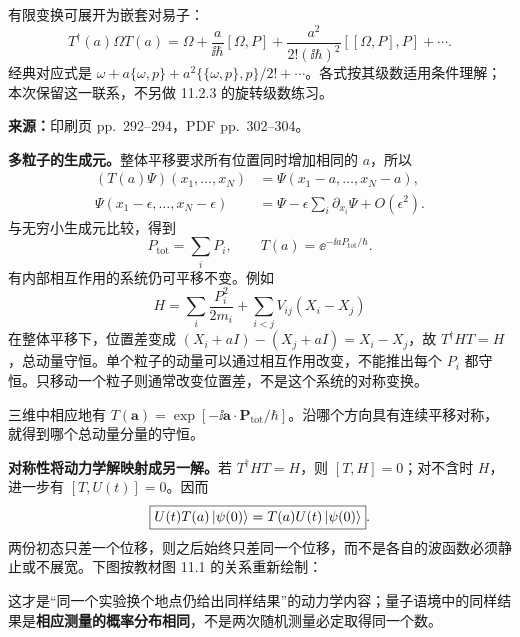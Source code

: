 有限变换可展开为嵌套对易子：
\begin{equation}
  T^\dagger(a)\Omega T(a)
   =\Omega+\frac{a}{\ii\hbar}[\Omega,P]
     +\frac{a^2}{2!(\ii\hbar)^2}[[\Omega,P],P]+\cdots.
\end{equation}
经典对应式是 $\omega+a\{\omega,p\}+a^2\{\{\omega,p\},p\}/2!+\cdots$。各式按其级数适用条件理解；本次保留这一联系，不另做 11.2.3 的旋转级数练习。

\textbf{来源：}印刷页 pp.~292--294，PDF pp.~302--304。

\textbf{多粒子的生成元。}整体平移要求所有位置同时增加相同的 $a$，所以
\begin{align}
  (T(a)\Psi)(x_1,\ldots,x_N)
    &=\Psi(x_1-a,\ldots,x_N-a),\\
  \Psi(x_1-\epsilon,\ldots,x_N-\epsilon)
    &=\Psi-\epsilon\sum_i\partial_{x_i}\Psi+O(\epsilon^2).
\end{align}
与无穷小生成元比较，得到
\begin{equation}
  \boxed{P_{\mathrm{tot}}=\sum_iP_i,\qquad
      T(a)=\ee^{-\ii aP_{\mathrm{tot}}/\hbar}}.
\end{equation}
有内部相互作用的系统仍可平移不变。例如
\begin{equation}
  H=\sum_i\frac{P_i^2}{2m_i}+\sum_{i<j}V_{ij}(X_i-X_j)
\end{equation}
在整体平移下，位置差变成 $(X_i+aI)-(X_j+aI)=X_i-X_j$，故 $T^\dagger HT=H$，总动量守恒。单个粒子的动量可以通过相互作用改变，不能推出每个 $P_i$ 都守恒。只移动一个粒子则通常改变位置差，不是这个系统的对称变换。

三维中相应地有 $T(\mathbf a)=\exp[-\ii\mathbf a\cdot\mathbf P_{\mathrm{tot}}/\hbar]$。沿哪个方向具有连续平移对称，就得到哪个总动量分量的守恒。

\textbf{对称性将动力学解映射成另一解。}若 $T^\dagger HT=H$，则 $[T,H]=0$；对不含时 $H$，进一步有 $[T,U(t)]=0$。因而
\begin{equation}
  \boxed{U(t)T(a)\left|\psi(0)\right\rangle
        =T(a)U(t)\left|\psi(0)\right\rangle}.
\end{equation}
两份初态只差一个位移，则之后始终只差同一个位移，而不是各自的波函数必须静止或不展宽。下图按教材图 11.1 的关系重新绘制：
\begin{center}
\end{center}
这才是“同一个实验换个地点仍给出同样结果”的动力学内容；量子语境中的同样结果是\textbf{相应测量的概率分布相同}，不是两次随机测量必定取得同一个数。

